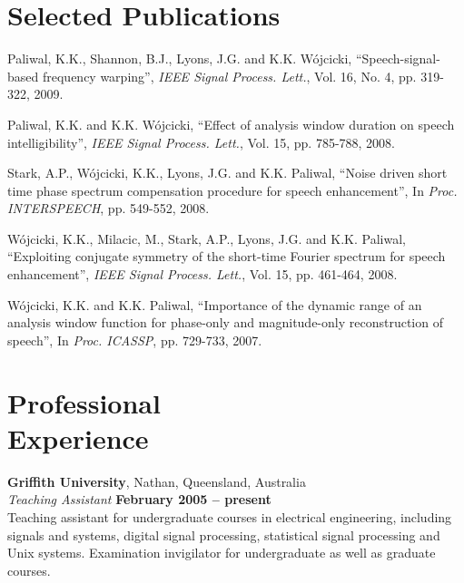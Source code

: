 \documentclass[margin,line]{resume}
\begin{document}
\begin{resume}
    \section{\mysidestyle Selected Publications}

    Paliwal, K.K., Shannon, B.J., Lyons, J.G. and K.K. W\'ojcicki,
    ``Speech-signal-based frequency warping'',
    \textsl{IEEE Signal Process. Lett.}, Vol. 16, No. 4, pp. 319-322, 2009.

\vspace{-2mm}
    Paliwal, K.K. and K.K. W\'ojcicki,
    ``Effect of analysis window duration on speech intelligibility'',
    \textsl{IEEE Signal Process. Lett.}, Vol. 15, pp. 785-788, 2008.

\vspace{-2mm}
    Stark, A.P., W\'ojcicki, K.K., Lyons, J.G. and K.K. Paliwal,
    ``Noise driven short time phase spectrum compensation procedure for speech enhancement'',
    In \textsl{Proc. INTERSPEECH}, pp. 549-552, 2008.

\vspace{-2mm}
    W\'ojcicki, K.K., Milacic, M., Stark, A.P., Lyons, J.G. and K.K. Paliwal,
    ``Exploiting conjugate symmetry of the short-time Fourier spectrum for speech enhancement'',
    \textsl{IEEE Signal Process. Lett.}, Vol. 15, pp. 461-464, 2008.

\vspace{-2mm}
    W\'ojcicki, K.K. and K.K. Paliwal,
    ``Importance of the dynamic range of an analysis window function for phase-only and magnitude-only reconstruction of speech'',
    In \textsl{Proc. ICASSP}, pp. 729-733, 2007.



    \section{\mysidestyle Professional\\Experience}

    \textbf{Griffith University}, Nathan, Queensland, Australia \vspace{2mm}\\\vspace{1mm}%
    \textsl{Teaching Assistant} \hfill \textbf{February 2005 -- present}\\
    Teaching assistant for undergraduate courses in electrical engineering,
    including signals and systems, digital signal processing, 
    statistical signal processing and Unix systems.
    Examination invigilator for undergraduate as well as graduate courses.



\end{resume}
\end{document}
